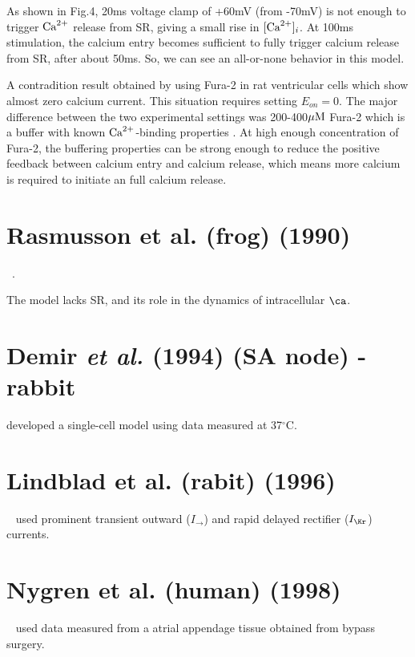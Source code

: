 As shown in Fig.4, 20ms voltage clamp of +60mV (from -70mV) is not enough to
trigger ${\text{Ca}^{2+}}$ release from SR, giving a small rise in $[{\text{Ca}^{2+}}]_i$. At 100ms
stimulation, the calcium entry becomes sufficient to fully trigger calcium
release from SR, after about 50ms. So, we can see an all-or-none behavior in
this model. 

A contradition result obtained by \citep{callewaert1988} using Fura-2 in rat
ventricular cells which show almost zero calcium current. This situation
requires setting $E_{on}=0$. The major difference between the two experimental
settings was 200-400${\mu\text{M}}$ Fura-2 which is a buffer with known ${\text{Ca}^{2+}}$-binding
properties \citep{jackson1987}. At high enough concentration of Fura-2, the
buffering properties can be strong enough to reduce the positive feedback
between calcium entry and calcium release, which means more calcium is required
to initiate an full calcium release.


\section[Rasmusson {\it et al.} (1990)]{Rasmusson et al. (frog) (1990)}
\label{sec:rasmusson-et-al}

~\citep{rasmusson1990mme}. 


The model lacks SR, and its role in the dynamics of intracellular
$\ca$. 

\section{Demir {\it et al.} (1994) (SA node) - rabbit}
\label{sec:demir1994_rabbit-atrial}

\citep{Demir1994} developed a single-cell model using data measured at
37$^\circ$C. 


\section{Lindblad et al. (rabit) (1996)}
\label{sec:lindblad-et-al}

~\citep{lindblad1996map} used prominent transient outward ($I_\to$) and rapid
delayed rectifier ($I_\Kr$) currents.

\section{Nygren et al. (human) (1998)}
\label{sec:nygren-et-al}

~\citep{nygren1998mma} used data measured from a atrial appendage tissue
obtained from bypass surgery. 

